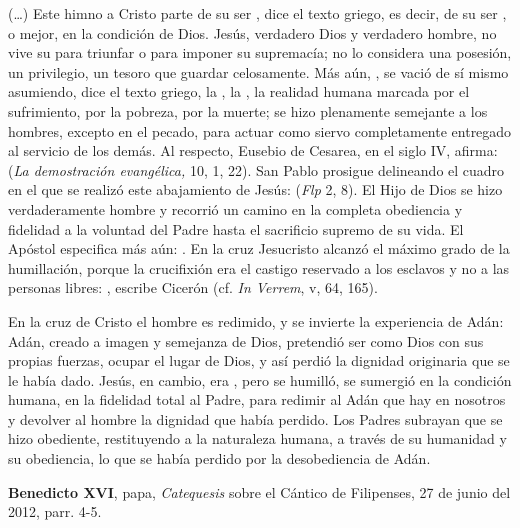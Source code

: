 \begin{patercite}  
	(\ldots) Este himno a Cristo parte de su ser , dice el texto griego, es decir, de su ser , o mejor, en la condición de Dios. Jesús, verdadero Dios y verdadero hombre, no vive su  para triunfar o para imponer su supremacía; no lo considera una posesión, un privilegio, un tesoro que guardar celosamente. Más aún, , se vació de sí mismo asumiendo, dice el texto griego, la , la , la realidad humana marcada por el sufrimiento, por la pobreza, por la muerte; se hizo plenamente semejante a los hombres, excepto en el pecado, para actuar como siervo completamente entregado al servicio de los demás. Al respecto, Eusebio de Cesarea, en el siglo IV, afirma:  (\emph{La demostración evangélica,} 10, 1, 22). San Pablo prosigue delineando el cuadro  en el que se realizó este abajamiento de Jesús:  (\emph{Flp} 2, 8). El Hijo de Dios se hizo verdaderamente hombre y recorrió un camino en la completa obediencia y fidelidad a la voluntad del Padre hasta el sacrificio supremo de su vida. El Apóstol especifica más aún: . En la cruz Jesucristo alcanzó el máximo grado de la humillación, porque la crucifixión era el castigo reservado a los esclavos y no a las personas libres: , escribe Cicerón (cf. \emph{In Verrem}, v, 64, 165).  
	
	En la cruz de Cristo el hombre es redimido, y se invierte la experiencia de Adán: Adán, creado a imagen y semejanza de Dios, pretendió ser como Dios con sus propias fuerzas, ocupar el lugar de Dios, y así perdió la dignidad originaria que se le había dado. Jesús, en cambio, era , pero se humilló, se sumergió en la condición humana, en la fidelidad total al Padre, para redimir al Adán que hay en nosotros y devolver al hombre la dignidad que había perdido. Los Padres subrayan que se hizo obediente, restituyendo a la naturaleza humana, a través de su humanidad y su obediencia, lo que se había perdido por la desobediencia de Adán.  
	
	\textbf{Benedicto XVI}, papa, \textit{Catequesis} sobre el Cántico de Filipenses, 27 de junio del 2012, parr. 4-5. 
\end{patercite}

